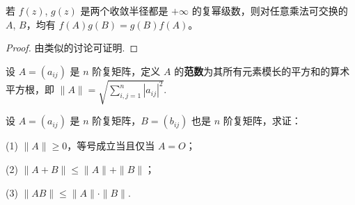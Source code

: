 \documentclass[../../main.tex]{subfiles}%
\begin{document}
\begin{corollary}\label{corollary:矩阵幂级数乘法可交换}
若 $f(z)$, $g(z)$ 是两个收敛半径都是 $+\infty$ 的复幂级数，则对任意乘法可交换的 $A$, $B$，均有 $f(A)g(B)=g(B)f(A)$。 
\end{corollary}
\begin{proof}
由类似的讨论可证明.
\end{proof}

\begin{definition}[矩阵的范数]\label{definition:矩阵的范数}
设 $A=(a_{ij})$ 是 $n$ 阶复矩阵，定义 $A$ 的\textbf{范数}为其所有元素模长的平方和的算术平方根，即 $\|A\| = \sqrt{\sum_{i,j = 1}^{n}|a_{ij}|^2}$.
\end{definition}

\begin{proposition}[矩阵的范数的基本性质]\label{proposition:矩阵的范数的基本性质}
设 $A=(a_{ij})$ 是 $n$ 阶复矩阵，$B=(b_{ij})$ 也是 $n$ 阶复矩阵，求证：

(1) $\|A\|\geqslant  0$，等号成立当且仅当 $A = O$；

(2) $\|A + B\|\leqslant  \|A\| + \|B\|$；

(3) $\|AB\|\leqslant  \|A\|\cdot\|B\|$.
\end{proposition}
\end{document}
